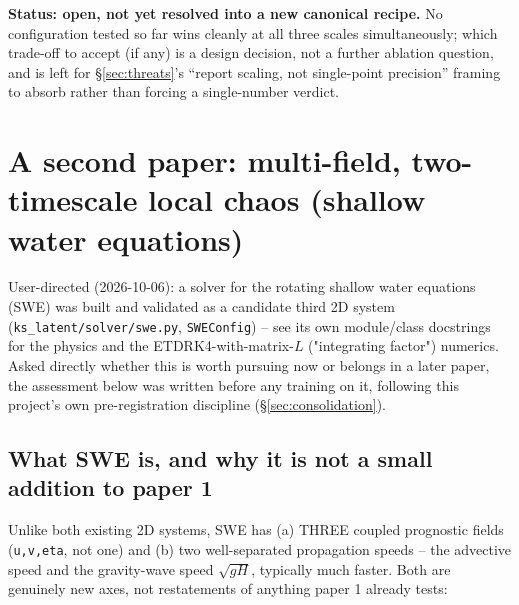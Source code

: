 \documentclass[11pt]{article}
\begin{document}
\textbf{Status: open, not yet resolved into a new canonical recipe.} No
configuration tested so far wins cleanly at all three scales
simultaneously; which trade-off to accept (if any) is a design decision,
not a further ablation question, and is left for \S\ref{sec:threats}'s
``report scaling, not single-point precision'' framing to absorb rather
than forcing a single-number verdict.

\section{A second paper: multi-field, two-timescale local chaos
(shallow water equations)}
\label{sec:swe_paper2}

User-directed (2026-10-06): a solver for the rotating shallow water
equations (SWE) was built and validated as a candidate third 2D system
(\texttt{ks\_latent/solver/swe.py}, \texttt{SWEConfig}) -- see its own
module/class docstrings for the physics and the ETDRK4-with-matrix-$L$
("integrating factor") numerics. Asked directly whether this is worth
pursuing now or belongs in a later paper, the assessment below was
written before any training on it, following this project's own
pre-registration discipline (\S\ref{sec:consolidation}).

\subsection{What SWE is, and why it is not a small addition to paper 1}

Unlike both existing 2D systems, SWE has (a) THREE coupled prognostic
fields (\texttt{u,v,eta}, not one) and (b) two well-separated
propagation speeds -- the advective speed and the gravity-wave speed
$\sqrt{gH}$, typically much faster. Both are genuinely new axes, not
restatements of anything paper 1 already tests:
\end{document}
